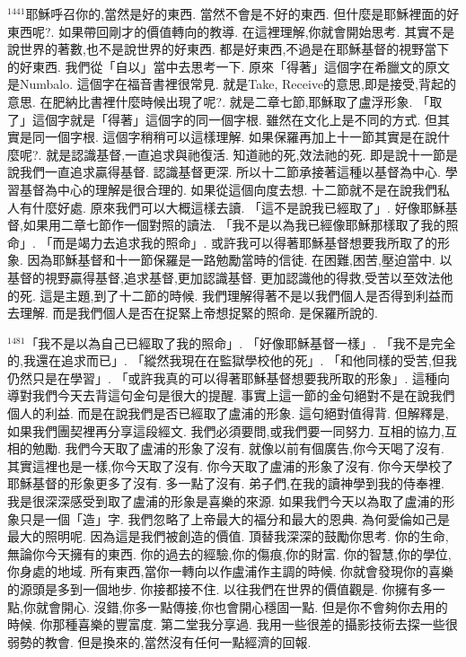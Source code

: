 \documentclass{book}
\begin{document}
$^{1441}$耶穌呼召你的,當然是好的東西.
當然不會是不好的東西.
但什麼是耶穌裡面的好東西呢?.
如果帶回剛才的價值轉向的教導.
在這裡理解,你就會開始思考.
其實不是說世界的著數,也不是說世界的好東西.
都是好東西,不過是在耶穌基督的視野當下的好東西.
我們從「自以」當中去思考一下.
原來「得著」這個字在希臘文的原文是Numbalo.
這個字在福音書裡很常見.
就是Take, Receive的意思,即是接受,背起的意思.
在肥納比書裡什麼時候出現了呢?.
就是二章七節,耶穌取了盧浮形象.
「取了」這個字就是「得著」這個字的同一個字根.
雖然在文化上是不同的方式.
但其實是同一個字根.
這個字稍稍可以這樣理解.
如果保羅再加上十一節其實是在說什麼呢?.
就是認識基督,一直追求與祂復活.
知道祂的死,效法祂的死.
即是說十一節是說我們一直追求贏得基督.
認識基督更深.
所以十二節承接著這種以基督為中心.
學習基督為中心的理解是很合理的.
如果從這個向度去想.
十二節就不是在說我們私人有什麼好處.
原來我們可以大概這樣去讀.
「這不是說我已經取了」.
好像耶穌基督,如果用二章七節作一個對照的讀法.
「我不是以為我已經像耶穌那樣取了我的照命」.
「而是竭力去追求我的照命」.
或許我可以得著耶穌基督想要我所取了的形象.
因為耶穌基督和十一節保羅是一路勉勵當時的信徒.
在困難,困苦,壓迫當中.
以基督的視野贏得基督,追求基督,更加認識基督.
更加認識他的得救,受苦以至效法他的死.
這是主題,到了十二節的時候.
我們理解得著不是以我們個人是否得到利益而去理解.
而是我們個人是否在捉緊上帝想捉緊的照命.
是保羅所說的.

$^{1481}$「我不是以為自己已經取了我的照命」.
「好像耶穌基督一樣」.
「我不是完全的,我還在追求而已」.
「縱然我現在在監獄學校他的死」.
「和他同樣的受苦,但我仍然只是在學習」.
「或許我真的可以得著耶穌基督想要我所取的形象」.
這種向導對我們今天去背這句金句是很大的提醒.
事實上這一節的金句絕對不是在說我們個人的利益.
而是在說我們是否已經取了盧浦的形象.
這句絕對值得背.
但解釋是,如果我們團契裡再分享這段經文.
我們必須要問,或我們要一同努力.
互相的協力,互相的勉勵.
我們今天取了盧浦的形象了沒有.
就像以前有個廣告,你今天喝了沒有.
其實這裡也是一樣,你今天取了沒有.
你今天取了盧浦的形象了沒有.
你今天學校了耶穌基督的形象更多了沒有.
多一點了沒有.
弟子們,在我的讀神學到我的侍奉裡.
我是很深深感受到取了盧浦的形象是喜樂的來源.
如果我們今天以為取了盧浦的形象只是一個「造」字.
我們忽略了上帝最大的福分和最大的恩典.
為何愛倫如己是最大的照明呢.
因為這是我們被創造的價值.
頂替我深深的鼓勵你思考.
你的生命,無論你今天擁有的東西.
你的過去的經驗,你的傷痕,你的財富.
你的智慧,你的學位,你身處的地域.
所有東西,當你一轉向以作盧浦作主調的時候.
你就會發現你的喜樂的源頭是多到一個地步.
你接都接不住.
以往我們在世界的價值觀是.
你擁有多一點,你就會開心.
沒錯,你多一點傳接,你也會開心穩固一點.
但是你不會夠你去用的時候.
你那種喜樂的豐富度.
第二堂我分享過.
我用一些很差的攝影技術去探一些很弱勢的教會.
但是換來的,當然沒有任何一點經濟的回報.
\end{document}
